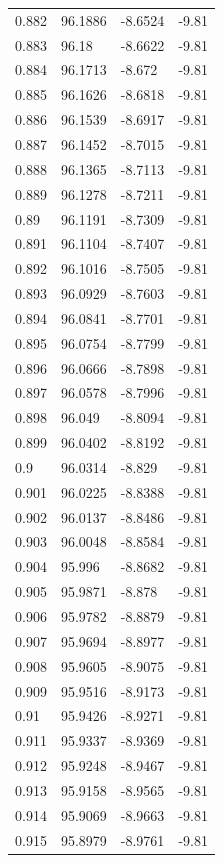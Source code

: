 \begin{tabular}{llll}
0.882 & 96.1886 & -8.6524 & -9.81 \\
0.883 & 96.18 & -8.6622 & -9.81 \\
0.884 & 96.1713 & -8.672 & -9.81 \\
0.885 & 96.1626 & -8.6818 & -9.81 \\
0.886 & 96.1539 & -8.6917 & -9.81 \\
0.887 & 96.1452 & -8.7015 & -9.81 \\
0.888 & 96.1365 & -8.7113 & -9.81 \\
0.889 & 96.1278 & -8.7211 & -9.81 \\
0.89 & 96.1191 & -8.7309 & -9.81 \\
0.891 & 96.1104 & -8.7407 & -9.81 \\
0.892 & 96.1016 & -8.7505 & -9.81 \\
0.893 & 96.0929 & -8.7603 & -9.81 \\
0.894 & 96.0841 & -8.7701 & -9.81 \\
0.895 & 96.0754 & -8.7799 & -9.81 \\
0.896 & 96.0666 & -8.7898 & -9.81 \\
0.897 & 96.0578 & -8.7996 & -9.81 \\
0.898 & 96.049 & -8.8094 & -9.81 \\
0.899 & 96.0402 & -8.8192 & -9.81 \\
0.9 & 96.0314 & -8.829 & -9.81 \\
0.901 & 96.0225 & -8.8388 & -9.81 \\
0.902 & 96.0137 & -8.8486 & -9.81 \\
0.903 & 96.0048 & -8.8584 & -9.81 \\
0.904 & 95.996 & -8.8682 & -9.81 \\
0.905 & 95.9871 & -8.878 & -9.81 \\
0.906 & 95.9782 & -8.8879 & -9.81 \\
0.907 & 95.9694 & -8.8977 & -9.81 \\
0.908 & 95.9605 & -8.9075 & -9.81 \\
0.909 & 95.9516 & -8.9173 & -9.81 \\
0.91 & 95.9426 & -8.9271 & -9.81 \\
0.911 & 95.9337 & -8.9369 & -9.81 \\
0.912 & 95.9248 & -8.9467 & -9.81 \\
0.913 & 95.9158 & -8.9565 & -9.81 \\
0.914 & 95.9069 & -8.9663 & -9.81 \\
0.915 & 95.8979 & -8.9761 & -9.81 \\

\end{tabular}
